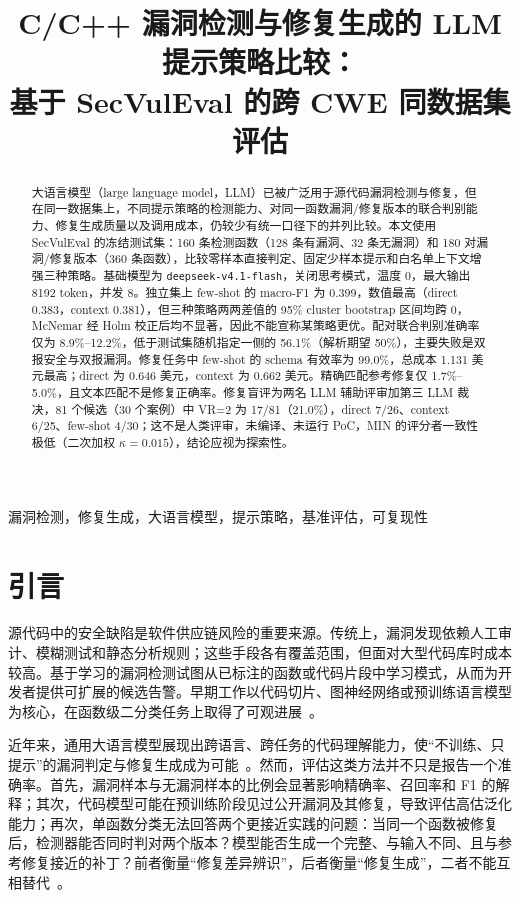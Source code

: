 \documentclass[conference]{IEEEtran}
\title{C/C++ 漏洞检测与修复生成的 LLM 提示策略比较：\\基于 SecVulEval 的跨 CWE 同数据集评估}
\author{
\IEEEauthorblockN{Yu Zhang}
\IEEEauthorblockA{CS224 课程项目\\
ShanghaiTech University\\
Shanghai, China\\
\href{mailto:Zhangyu12026@shanghaitech.edu.cn}{Zhangyu12026@shanghaitech.edu.cn}}
}
\begin{document}
\maketitle

\begin{abstract}
大语言模型（large language model，LLM）已被广泛用于源代码漏洞检测与修复，但在同一数据集上，不同提示策略的检测能力、对同一函数漏洞/修复版本的联合判别能力、修复生成质量以及调用成本，仍较少有统一口径下的并列比较。本文使用 SecVulEval 的冻结测试集：160 条检测函数（128 条有漏洞、32 条无漏洞）和 180 对漏洞/修复版本（360 条函数），比较零样本直接判定、固定少样本提示和白名单上下文增强三种策略。基础模型为 \texttt{deepseek-v4.1-flash}，关闭思考模式，温度 0，最大输出 8192 token，并发 8。独立集上 few-shot 的 macro-F1 为 0.399，数值最高（direct 0.383，context 0.381），但三种策略两两差值的 95\% cluster bootstrap 区间均跨 0，McNemar 经 Holm 校正后均不显著，因此不能宣称某策略更优。配对联合判别准确率仅为 8.9\%--12.2\%，低于测试集随机指定一侧的 56.1\%（解析期望 50\%），主要失败是双报安全与双报漏洞。修复任务中 few-shot 的 schema 有效率为 99.0\%，总成本 1.131 美元最高；direct 为 0.646 美元，context 为 0.662 美元。精确匹配参考修复仅 1.7\%--5.0\%，且文本匹配不是修复正确率。修复盲评为两名 LLM 辅助评审加第三 LLM 裁决，81 个候选（30 个案例）中 VR=2 为 17/81（21.0\%），direct 7/26、context 6/25、few-shot 4/30；这不是人类评审，未编译、未运行 PoC，MIN 的评分者一致性极低（二次加权 $\kappa=0.015$），结论应视为探索性。
\end{abstract}

\begin{IEEEkeywords}
漏洞检测，修复生成，大语言模型，提示策略，基准评估，可复现性
\end{IEEEkeywords}

\section{引言}
\label{sec:intro}
源代码中的安全缺陷是软件供应链风险的重要来源。传统上，漏洞发现依赖人工审计、模糊测试和静态分析规则；这些手段各有覆盖范围，但面对大型代码库时成本较高。基于学习的漏洞检测试图从已标注的函数或代码片段中学习模式，从而为开发者提供可扩展的候选告警。早期工作以代码切片、图神经网络或预训练语言模型为核心，在函数级二分类任务上取得了可观进展~\cite{li2018vuldeepecker,zhou2019devign,feng2020codebert,fu2022linevul}。

近年来，通用大语言模型展现出跨语言、跨任务的代码理解能力，使“不训练、只提示”的漏洞判定与修复生成成为可能~\cite{chen2021codex,pearce2023zeroshot}。然而，评估这类方法并不只是报告一个准确率。首先，漏洞样本与无漏洞样本的比例会显著影响精确率、召回率和 F1 的解释；其次，代码模型可能在预训练阶段见过公开漏洞及其修复，导致评估高估泛化能力；再次，单函数分类无法回答两个更接近实践的问题：当同一个函数被修复后，检测器能否同时判对两个版本？模型能否生成一个完整、与输入不同、且与参考修复接近的补丁？前者衡量“修复差异辨识”，后者衡量“修复生成”，二者不能互相替代~\cite{ding2025primevul,pearce2023zeroshot}。
\end{document}
